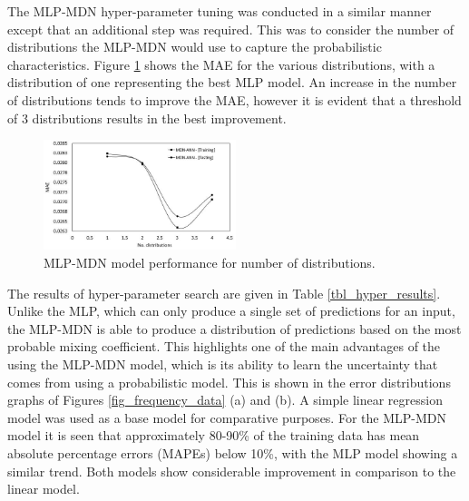\documentclass[a4paper,fleqn]{cas-dc}
\begin{document}
The MLP-MDN hyper-parameter tuning was conducted in a similar manner except that an additional step was required. This was to consider the number of distributions the MLP-MDN would use to capture the probabilistic characteristics. Figure \ref{fig_mdn_hyper} shows the MAE for the various distributions, with a distribution of one representing the best MLP model. An increase in the number of distributions tends to improve the MAE, however it is evident that a threshold of 3 distributions results in the best improvement.\\
\begin{figure}[h!]
	\centering
		\includegraphics[width=0.5\textwidth]{DIST_HYPER}
	  \caption{MLP-MDN model performance for number of distributions.}\label{fig_mdn_hyper}
\end{figure}

The results of hyper-parameter search are given in Table \ref{tbl_hyper_results}. Unlike the MLP, which can only produce a single set of predictions for an input, the MLP-MDN is able to produce a distribution of predictions based on the most probable mixing coefficient. This highlights one of the main advantages of the using the MLP-MDN model, which is its ability to learn the uncertainty that comes from using a probabilistic model. This is shown in the error distributions graphs of Figures \ref{fig_frequency_data} (a) and (b). A simple linear regression model was used as a base model for comparative purposes. For the MLP-MDN model it is seen that approximately 80-90\% of the training data has mean absolute percentage errors (MAPEs) below 10\%, with the MLP model showing a similar trend. Both models show considerable improvement in comparison to the linear model.\\
\end{document}
